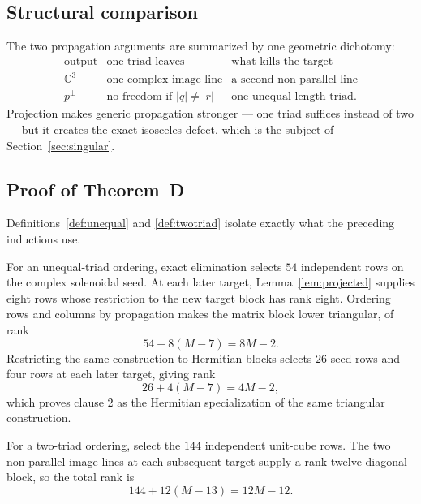 \documentclass[11pt]{article}
\theoremstyle{definition}
\theoremstyle{remark}
\theoremstyle{plain}
\newcommand{\C}{\mathbb{C}}
\begin{document}
\subsection{Structural comparison}
\label{subsec:comparison}

The two propagation arguments are summarized by one geometric dichotomy:
\begin{equation}
\label{eq:dichotomy}
\begin{array}{c|c|c}
\text{output}&\text{one triad leaves}&\text{what kills the target}\\ \hline
\C^{3}&\text{one complex image line}&\text{a second non-parallel line}\\
p^{\perp}&\text{no freedom if }|q|\ne|r|&\text{one unequal-length triad}.
\end{array}
\end{equation}
Projection makes generic propagation stronger --- one triad suffices instead of
two --- but it creates the exact isosceles defect, which is the subject of
Section~\ref{sec:singular}.

\subsection{Proof of Theorem~D}
\label{subsec:thmDproof}

Definitions~\ref{def:unequal} and \ref{def:twotriad} isolate exactly what the
preceding inductions use.

For an unequal-triad ordering, exact elimination selects $54$ independent rows
on the complex solenoidal seed. At each later target, Lemma~\ref{lem:projected}
supplies eight rows whose restriction to the new target block has rank eight.
Ordering rows and columns by propagation makes the matrix block lower
triangular, of rank
\begin{equation}
\label{eq:count8}
54+8(M-7)=8M-2 .
\end{equation}
Restricting the same construction to Hermitian blocks selects $26$ seed rows
and four rows at each later target, giving rank
\begin{equation}
\label{eq:count4}
26+4(M-7)=4M-2 ,
\end{equation}
which proves clause 2 as the Hermitian specialization of the same triangular
construction.

For a two-triad ordering, select the $144$ independent unit-cube rows. The two
non-parallel image lines at each subsequent target supply a rank-twelve
diagonal block, so the total rank is
\begin{equation}
\label{eq:count12}
144+12(M-13)=12M-12 .
\end{equation}
\end{document}
